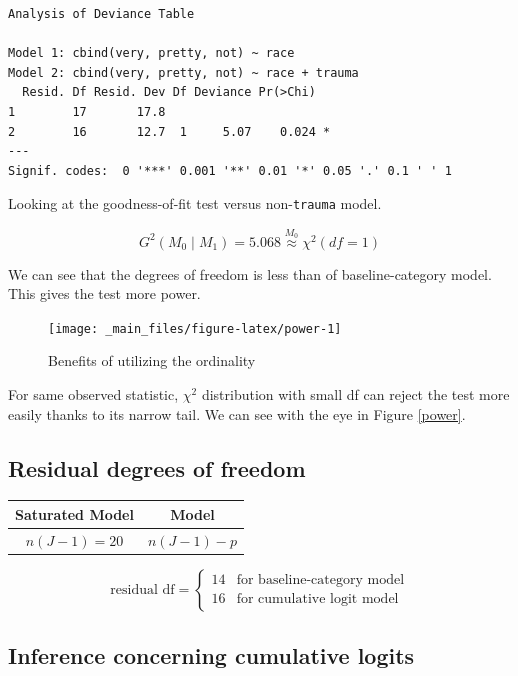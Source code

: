 \documentclass[]{book}
\begin{document}
\begin{verbatim}
Analysis of Deviance Table

Model 1: cbind(very, pretty, not) ~ race
Model 2: cbind(very, pretty, not) ~ race + trauma
  Resid. Df Resid. Dev Df Deviance Pr(>Chi)  
1        17       17.8                       
2        16       12.7  1     5.07    0.024 *
---
Signif. codes:  0 '***' 0.001 '**' 0.01 '*' 0.05 '.' 0.1 ' ' 1
\end{verbatim}

Looking at the goodness-of-fit test versus non-\texttt{trauma} model.

\[G^2(M_0 \mid M_1) = 5.068 \stackrel{M_0}{\approx} \chi^2(df = 1)\]

We can see that the degrees of freedom is less than of baseline-category model. This gives the test more power.

\begin{figure}[H]

{\centering \texttt{[image: \_main\_files/figure-latex/power-1]} 

}

\caption{Benefits of utilizing the ordinality\label{power}}\label{fig:power}
\end{figure}

For same observed statistic, \(\chi^2\) distribution with small df can reject the test more easily thanks to its narrow tail. We can see with the eye in Figure \ref{power}.

\hypertarget{residual-degrees-of-freedom}{%
\subsection{Residual degrees of freedom}\label{residual-degrees-of-freedom}}

\begin{longtable}[]{@{}cc@{}}
\toprule
Saturated Model & Model\tabularnewline
\midrule
\endhead
\(n(J-1) = 20\) & \(n(J - 1)- p\)\tabularnewline
\bottomrule
\end{longtable}

\[
\text{residual df} = \begin{cases}
14 & \text{for baseline-category model} \\
16 & \text{for cumulative logit model}
\end{cases}
\]

\hypertarget{inference-concerning-cumulative-logits}{%
\subsection{Inference concerning cumulative logits}\label{inference-concerning-cumulative-logits}}
\end{document}
